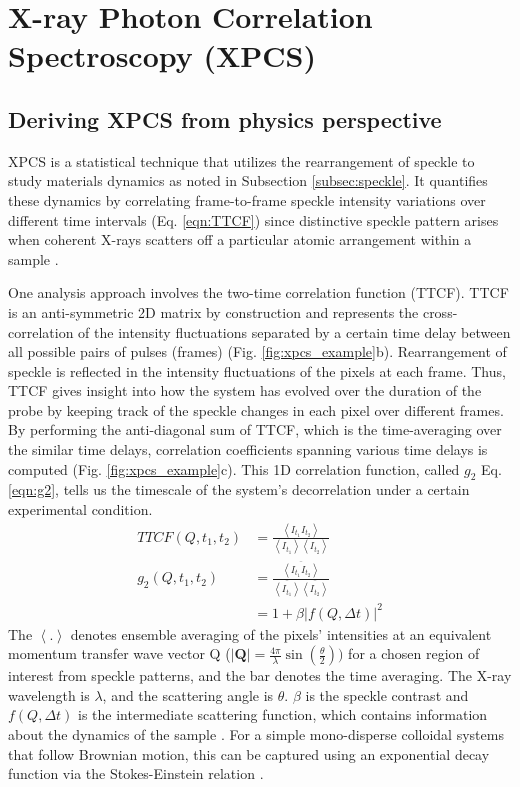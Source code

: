 \documentclass[11pt]{article}
\theoremstyle{definition}
\newcommand{\QQ}{\textbf{Q}}
\begin{document}
\section{X-ray Photon Correlation Spectroscopy (XPCS)}
\label{sec:XPCS}
\subsection{Deriving XPCS from physics perspective}
\label{subsec:xpcs}
XPCS is a statistical technique that utilizes the rearrangement of speckle to study materials dynamics as noted in Subsection \ref{subsec:speckle}. It quantifies these dynamics by correlating frame-to-frame speckle intensity variations over different time intervals (Eq. \ref{eqn:TTCF}) since distinctive speckle pattern arises when coherent X-rays scatters off a particular atomic arrangement within a sample \cite{jo_single_2023}. 

One analysis approach involves the two-time correlation function (TTCF). TTCF is an anti-symmetric 2D matrix by construction \cite{cao_effect_2020} and represents the cross-correlation of the intensity fluctuations separated by a certain time delay between all possible pairs of pulses (frames) (Fig. \ref{fig:xpcs_example}b). Rearrangement of speckle is reflected in the intensity fluctuations of the pixels at each frame. Thus, TTCF gives insight into how the system has evolved over the duration of the probe by keeping track of the speckle changes in each pixel over different frames. By performing the anti-diagonal sum of TTCF, which is the time-averaging over the similar time delays, correlation coefficients spanning various time delays is computed (Fig. \ref{fig:xpcs_example}c). This 1D correlation function, called \(g_2\) Eq. \ref{eqn:g2}, tells us the timescale of the system's decorrelation under a certain experimental condition. 
\begin{subequations}\label{eqn:TTCF_g2}
\begin{align}
\label{eqn:TTCF}
TTCF(Q, t_1, t_2) &= \frac{\left<I_{t_1} I_{t_2}\right>}{\left<I_{t_1}\right> \left<I_{t_2}\right>} \\
\label{eqn:g2}
g_2(Q, t_1, t_2) &= \frac{\overline{\left<{I}_{t_1} {I}_{t_2}\right>}}{\overline{\left<{I}_{t_1}\right>} \overline{\left<{I}_{t_2}\right>}} \\
&= 1 + \beta |f(Q, \Delta t)|^2
\end{align}
\end{subequations}
The $\left<.\right>$ denotes ensemble averaging of the pixels' intensities at an equivalent momentum transfer wave vector Q ($|\QQ| = \frac{4 \pi}{\lambda} \sin(\frac{\theta}{2}))$ for a chosen region of interest from speckle patterns, and the bar denotes the time averaging. The X-ray wavelength is $\lambda$, and the scattering angle is $\theta$. $\beta$ is the speckle contrast and $f(Q, \Delta t)$ is the intermediate scattering function, which contains information about the dynamics of the sample \cite{jo_single_2023}. For a simple mono-disperse colloidal systems that follow Brownian motion, this can be captured using an exponential decay function via the Stokes-Einstein relation \cite{jo_single_2023}.
\end{document}
